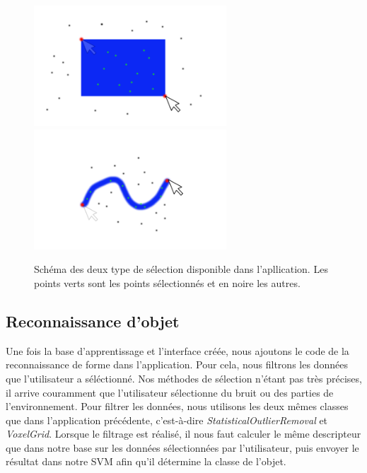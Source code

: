 \begin{figure}[!h]
  \begin{center}
    \includegraphics[height=4.5cm]{image/selection1.png}
    \includegraphics[height=4.5cm]{image/selection2.png}
    \caption{Schéma des deux type de sélection disponible dans l'apllication. Les points verts
    sont les points sélectionnés et en noire les autres.}
  \end{center}
\end{figure}

\subsection{Reconnaissance d'objet}
Une fois la base d'apprentissage et l'interface créée, nous ajoutons le code de la reconnaissance de forme dans l'application.
Pour cela, nous filtrons les données que l'utilisateur a séléctionné. Nos méthodes de sélection n'étant pas très précises, il arrive
couramment que l'utilisateur sélectionne du bruit ou des parties de l'environnement. Pour filtrer les données, nous utilisons
les deux mêmes classes que dans l'application précédente, c'est-à-dire \textit{StatisticalOutlierRemoval} et \textit{VoxelGrid}.
Lorsque le filtrage est réalisé, il nous faut calculer le même descripteur que dans notre base sur les données sélectionnées par 
l'utilisateur, puis envoyer le résultat dans notre SVM afin qu'il détermine la classe de l'objet.\\

